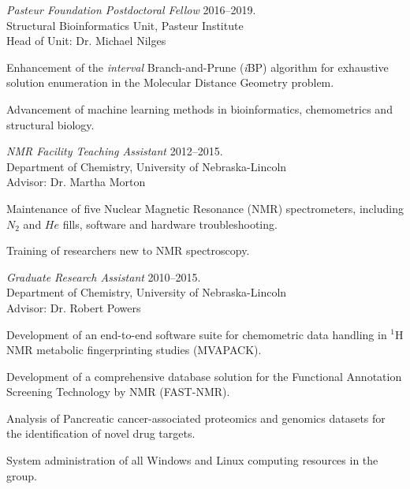 \documentclass[letterpaper]{article}
\renewenvironment{itemize}{
  \begin{list}{}{
    \setlength{\leftmargin}{1.5em}
  }
}{
  \end{list}
}
\begin{document}
\begin{itemize}
\setlength{\itemsep}{16pt}
\item{
  {\it Pasteur Foundation Postdoctoral Fellow}
  \hfill 2016--2019. \\
  Structural Bioinformatics Unit, Pasteur Institute \\
  Head of Unit: Dr. Michael Nilges \\
  \begin{enumerate*}
    \item Enhancement of the {\it interval} Branch-and-Prune
    ({\it i}BP) algorithm for exhaustive solution enumeration in the
    Molecular Distance Geometry problem.
    \item Advancement of machine learning methods in bioinformatics,
    chemometrics and structural biology.
  \end{enumerate*}
}

\pagebreak
\item{
  {\it NMR Facility Teaching Assistant}
  \hfill 2012--2015. \\
  Department of Chemistry, University of Nebraska-Lincoln \\
  Advisor: Dr. Martha Morton
  \begin{enumerate*}
    \item Maintenance of five Nuclear Magnetic Resonance (NMR) spectrometers,
      including $N_2$ and $He$ fills, software and hardware troubleshooting.
    \item Training of researchers new to NMR spectroscopy.
  \end{enumerate*}
}

\item{
  {\it Graduate Research Assistant}
  \hfill 2010--2015. \\
  Department of Chemistry, University of Nebraska-Lincoln \\
  Advisor: Dr. Robert Powers
  \begin{enumerate*}
    \item Development of an end-to-end software suite for chemometric data
      handling in $^1$H NMR metabolic fingerprinting studies (MVAPACK).
    \item Development of a comprehensive database solution for the Functional
      Annotation Screening Technology by NMR (FAST-NMR).
    \item Analysis of Pancreatic cancer-associated proteomics and genomics
      datasets for the identification of novel drug targets.
    \item System administration of all Windows and Linux computing resources
      in the group.
  \end{enumerate*}
}


\end{itemize}
\end{document}
